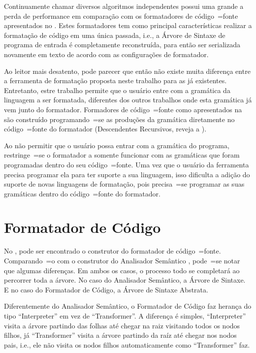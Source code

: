 Continuamente chamar diversos algoritmos independentes possui uma grande a perda de performance em comparação com os formatadores de código~=fonte apresentados no .
Estes formatadores tem como principal características realizar a formatação de código em uma única passada,
i.e.,
a Árvore de Sintaxe de programa de entrada é completamente reconstruída,
para então ser serializada novamente em texto de acordo com as configurações de formatador.

Ao leitor mais desatento,
pode parecer que então não existe muita diferença entre a ferramenta de formatação proposta neste trabalho para as já existentes.
Entretanto,
estre trabalho permite que o usuário entre com a gramática da linguagem a ser formatada,
diferentes dos outros trabalhos onde esta gramática já vem junto do formatador.
Formadores de código~=fonte como apresentados na  são construído programando~=se as produções da gramática diretamente no código~=fonte do formatador (Descendentes Recursivos,
reveja a ).

Ao não permitir que o usuário possa entrar com a gramática do programa,
restringe~=se o formatador a somente funcionar com as gramáticas que foram programadas dentro do seu código~=fonte.
Uma vez que o usuário da ferramenta precisa programar ela para ter suporte a sua linguagem,
isso dificulta a adição do suporte de novas linguagens de formatação,
pois precisa~=se programar as suas gramáticas dentro do código~=fonte do formatador.


\section{Formatador de Código}

No ,
pode ser encontrado o construtor do formatador de código~=fonte.
Comparando~=o com o construtor do Analisador Semântico ,
pode~=se notar que algumas diferenças.
Em ambos os casos,
o processo todo se completará ao percorrer toda a árvore.
No caso do Analisador Semântico,
a Árvore de Sintaxe.
E no caso do Formatador de Código,
a Árvore de Sintaxe Abstrata.

Diferentemente do Analisador Semântico,
o Formatador de Código faz herança do tipo ``Interpreter'' em vez de ``Transformer''.
A diferença é simples,
``Interpreter'' visita a árvore partindo das folhas até chegar na raiz visitando todos os nodos filhos,
já ``Transformer'' visita a árvore partindo da raíz até chegar nos nodos pais,
i.e.,
ele não visita os nodos filhos automaticamente como ``Transformer'' faz.

